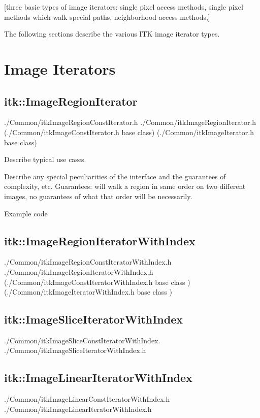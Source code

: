 [three basic types of image iterators: single pixel access methods, single
pixel methods which walk special paths, neighborhood access methods,]

The following sections describe the various ITK image iterator types.

\section{Image Iterators}
\label{sec:ImageIterators}



\subsection{itk::ImageRegionIterator}
\label{sec:itkImageRegionIterator}
./Common/itkImageRegionConstIterator.h
./Common/itkImageRegionIterator.h
(./Common/itkImageConstIterator.h base class)
(./Common/itkImageIterator.h base class)

Describe typical use cases.

Describe any special peculiarities of the interface and the guarantees of
complexity, etc.  Guarantees: will walk a region in same order on two different
images, no guarantees of what that order will be necessarily.

Example code

\subsection{itk::ImageRegionIteratorWithIndex}
\label{sec:itkImageRegionIteratorWithIndex}
./Common/itkImageRegionConstIteratorWithIndex.h
./Common/itkImageRegionIteratorWithIndex.h
(./Common/itkImageConstIteratorWithIndex.h  base class )
(./Common/itkImageIteratorWithIndex.h  base class )

\subsection{itk::ImageSliceIteratorWithIndex}
\label{sec:itkImageSliceIteratorWithIndex}
./Common/itkImageSliceConstIteratorWithIndex.
./Common/itkImageSliceIteratorWithIndex.h

\subsection{itk::ImageLinearIteratorWithIndex}
\label{sec:itkImageLinearIteratorWithIndex}
./Common/itkImageLinearConstIteratorWithIndex.h
./Common/itkImageLinearIteratorWithIndex.h


